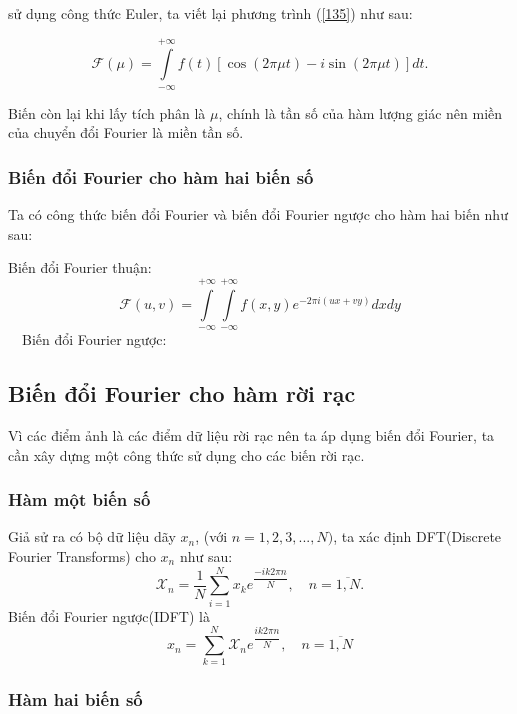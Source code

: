 \documentclass[12pt,a4paper]{report}
\numberwithin{equation}{section}
\theoremstyle{definition} %
\begin{document}
sử dụng công thức Euler, ta viết lại phương trình (\ref{135}) như sau:

\begin{equation}
	\label{137}
     \mathcal{F}(\mu)=\int\limits_{-\infty}^{+\infty}f(t)[\cos(2\pi\mu t)-i\sin(2\pi\mu t)]dt.
\end{equation}

Biến còn lại khi lấy tích phân là $\mu$, chính là tần số của hàm lượng giác nên miền của chuyển đổi Fourier là miền tần số.

\subsubsection{Biến đổi Fourier cho hàm hai biến số}

Ta có công thức biến đổi Fourier và biến đổi Fourier ngược cho hàm hai biến như sau:

Biến đổi Fourier thuận:
\begin{equation}
\mathcal{F}(u,v) = \int\limits_{-\infty}^{+\infty}\int\limits_{-\infty}^{+\infty}f(x,y)e^{-2\pi i(ux+vy)}dxdy
\end{equation}\
\
Biến đổi Fourier ngược:



\subsection{Biến đổi Fourier cho hàm rời rạc}

Vì các điểm ảnh là các điểm dữ liệu rời rạc nên ta áp dụng biến đổi Fourier, ta cần xây dựng một công thức sử dụng cho các biến rời rạc.

\subsubsection{Hàm một biến số}

Giả sử ra có bộ dữ liệu dãy $x_n$, (với $n= 1,2,3,...,N)$, ta xác định DFT(Discrete Fourier Transforms) cho $x_n$ như sau: 
\begin{equation}
	\label{144}
    \mathcal{X}_n= \dfrac{1}{N}\sum_{i=1}^Nx_ke^{\dfrac{-ik2\pi n}{N}},\quad n=\overline{1,N}.
\end{equation}
Biến đổi Fourier ngược(IDFT) là
\begin{equation}
	\label{145}
    x_n =\sum_{k=1}^N\mathcal{X}_ne^{\dfrac{ik2\pi n}{N}},\quad n=\overline{1,N}
\end{equation}
\subsubsection{Hàm hai biến số}
\end{document}
